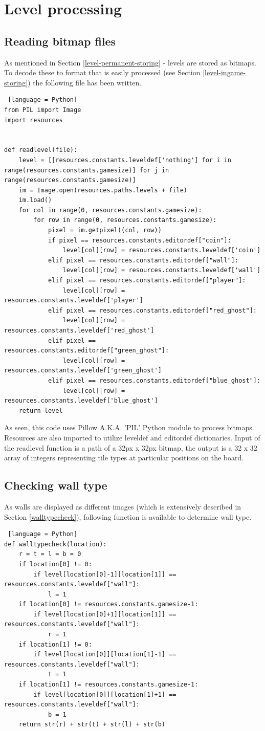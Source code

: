 \documentclass[11pt,a4paper]{report}
\newcommand{\dsubsection}[1]{\FloatBarrier \subsection{#1}}
\begin{document}
		\section{Level processing}
			\dsubsection{Reading bitmap files}
				As mentioned in Section \ref{level-permanent-storing} - levels are stored as bitmaps. To decode these to format that is easily processed (see Section \ref{level-ingame-storing}) the following file has been written.
				\begin{lstlisting} [language = Python]
from PIL import Image
import resources


def readlevel(file):
	level = [[resources.constants.leveldef['nothing'] for i in range(resources.constants.gamesize)] for j in range(resources.constants.gamesize)]
	im = Image.open(resources.paths.levels + file)
	im.load()
	for col in range(0, resources.constants.gamesize):
		for row in range(0, resources.constants.gamesize):
			pixel = im.getpixel((col, row))
			if pixel == resources.constants.editordef["coin"]:
				level[col][row] = resources.constants.leveldef['coin']
			elif pixel == resources.constants.editordef["wall"]:
				level[col][row] = resources.constants.leveldef['wall']
			elif pixel == resources.constants.editordef["player"]:
				level[col][row] = resources.constants.leveldef['player']
			elif pixel == resources.constants.editordef["red_ghost"]:
				level[col][row] = resources.constants.leveldef['red_ghost']
			elif pixel == resources.constants.editordef["green_ghost"]:
				level[col][row] = resources.constants.leveldef['green_ghost']
			elif pixel == resources.constants.editordef["blue_ghost"]:
				level[col][row] = resources.constants.leveldef['blue_ghost']
	return level
				\end{lstlisting}
				As seen, this code uses Pillow A.K.A. 'PIL' Python module to process bitmaps. Resources are also imported to utilize leveldef and editordef dictionaries. Input of the readlevel function is a path of a 32px x 32px bitmap, the output is a 32 x 32 array of integers representing tile types at particular positions on the board. 
			\dsubsection{Checking wall type}
				As walls are displayed as different images (which is extensively described in Section \ref{walltypecheck}), following function is available to determine wall type.
				\begin{lstlisting} [language = Python]
def walltypecheck(location):
	r = t = l = b = 0
	if location[0] != 0:
		if level[location[0]-1][location[1]] == resources.constants.leveldef["wall"]:
			l = 1
	if location[0] != resources.constants.gamesize-1:
		if level[location[0]+1][location[1]] == resources.constants.leveldef["wall"]:
			r = 1
	if location[1] != 0:
		if level[location[0]][location[1]-1] == resources.constants.leveldef["wall"]:
			t = 1
	if location[1] != resources.constants.gamesize-1:
		if level[location[0]][location[1]+1] == resources.constants.leveldef["wall"]:
			b = 1
	return str(r) + str(t) + str(l) + str(b)
				\end{lstlisting}
\end{document}
